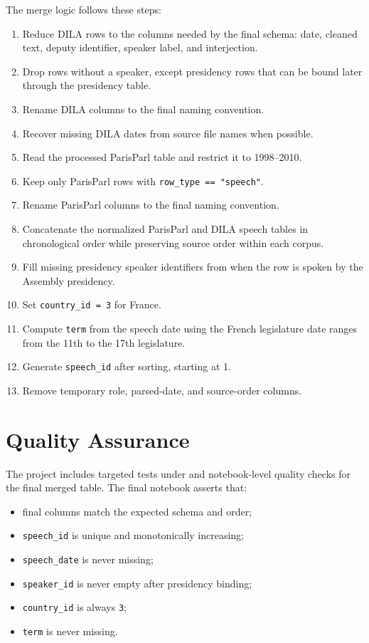 \documentclass[11pt,a4paper]{article}
\begin{document}
The merge logic follows these steps:

\begin{enumerate}
  \item Reduce DILA rows to the columns needed by the final schema:
  date, cleaned text, deputy identifier, speaker label, and interjection.
  \item Drop rows without a speaker, except presidency rows that can be bound
  later through the presidency table.
  \item Rename DILA columns to the final naming convention.
  \item Recover missing DILA dates from source file names when possible.
  \item Read the processed ParisParl table and restrict it to 1998--2010.
  \item Keep only ParisParl rows with \texttt{row\_type == "speech"}.
  \item Rename ParisParl columns to the final naming convention.
  \item Concatenate the normalized ParisParl and DILA speech tables in
  chronological order while preserving source order within each corpus.
  \item Fill missing presidency speaker identifiers from 
  when the row is spoken by the Assembly presidency.
  \item Set \texttt{country\_id = 3} for France.
  \item Compute \texttt{term} from the speech date using the French legislature
  date ranges from the 11th to the 17th legislature.
  \item Generate \texttt{speech\_id} after sorting, starting at 1.
  \item Remove temporary role, parsed-date, and source-order columns.
\end{enumerate}

\section{Quality Assurance}

The project includes targeted tests under  and notebook-level
quality checks for the final merged table. The final notebook asserts that:

\begin{itemize}
  \item final columns match the expected schema and order;
  \item \texttt{speech\_id} is unique and monotonically increasing;
  \item \texttt{speech\_date} is never missing;
  \item \texttt{speaker\_id} is never empty after presidency binding;
  \item \texttt{country\_id} is always \texttt{3};
  \item \texttt{term} is never missing.
\end{itemize}
\end{document}
